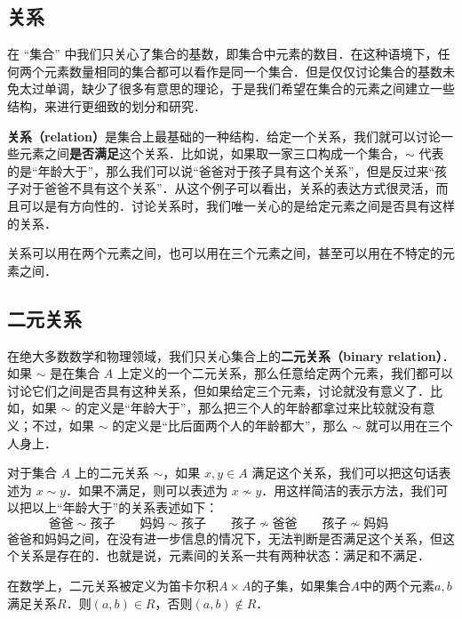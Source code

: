 

\subsection{关系}

在 “集合” 中我们只关心了集合的基数，即集合中元素的数目．在这种语境下，任何两个元素数量相同的集合都可以看作是同一个集合．但是仅仅讨论集合的基数未免太过单调，缺少了很多有意思的理论，于是我们希望在集合的元素之间建立一些结构，来进行更细致的划分和研究．

\textbf{关系（relation）}是集合上最基础的一种结构．给定一个关系，我们就可以讨论一些元素之间\textbf{是否满足}这个关系．比如说，如果取一家三口构成一个集合，$\sim$ 代表的是“年龄大于”，那么我们可以说“爸爸对于孩子具有这个关系”，但是反过来“孩子对于爸爸不具有这个关系”．从这个例子可以看出，关系的表达方式很灵活，而且可以是有方向性的．讨论关系时，我们唯一关心的是给定元素之间是否具有这样的关系．

关系可以用在两个元素之间，也可以用在三个元素之间，甚至可以用在不特定的元素之间．

\subsection{二元关系}

在绝大多数数学和物理领域，我们只关心集合上的\textbf{二元关系（binary relation）}．如果 $\sim$ 是在集合 $A$ 上定义的一个二元关系，那么任意给定两个元素，我们都可以讨论它们之间是否具有这种关系，但如果给定三个元素，讨论就没有意义了．比如，如果 $\sim$ 的定义是“年龄大于”，那么把三个人的年龄都拿过来比较就没有意义；不过，如果 $\sim$ 的定义是“比后面两个人的年龄都大”，那么 $\sim$ 就可以用在三个人身上．

对于集合 $A$ 上的二元关系 $\sim$，如果 $x, y\in A$ 满足这个关系，我们可以把这句话表述为 $x\sim y$．如果不满足，则可以表述为 $x\not\sim y$．用这样简洁的表示方法，我们可以把以上“年龄大于”的关系表述如下：
\begin{equation}
\text{爸爸}\sim\text{孩子} \qquad
\text{妈妈}\sim\text{孩子} \qquad
\text{孩子}\not\sim\text{爸爸} \qquad
\text{孩子}\not\sim\text{妈妈} \qquad
\end{equation}
爸爸和妈妈之间，在没有进一步信息的情况下，无法判断是否满足这个关系，但这个关系是存在的．也就是说，元素间的关系一共有两种状态：满足和不满足．

在数学上，二元关系被定义为笛卡尔积$A \times A$的子集，如果集合$A$中的两个元素$a,b$满足关系$R$．则$(a,b) \in R$，否则$(a,b) \notin R$．


